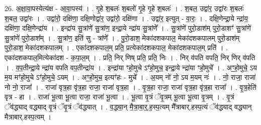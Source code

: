 \documentclass[17pt]{extarticle}
\begin{document}
26. अ॒क्षा॒वा॒पस्येत्य॑क्ष - आ॒वा॒पस्य॑ । . गृ॒हे श॒बलः॑ श॒बलो॑ गृ॒हे गृ॒हे श॒बलः॑ । . श॒बल॒ उद्वा॑र॒ उद्वा॑रः श॒बलः॑ श॒बल॒ उद्वा॑रः । . उद्वा॑रो॒ दक्षि॑णा॒ दक्षि॒णोद्वा॑र॒ उद्वा॑रो॒ दक्षि॑णा । . उद्वा॑र॒ इत्युत् - वा॒रः॒ । . दक्षि॒णेन्द्रा॒ये न्द्रा॑य॒ दक्षि॑णा॒ दक्षि॒णेन्द्रा॑य । . इन्द्रा॑य सु॒त्रांणे॑ सु॒त्रांण॒ इन्द्रा॒ये न्द्रा॑य सु॒त्रांणे᳚ । . सु॒त्रांणे॑ पुरो॒डाश॑म् पुरो॒डाशꣳ॑ सु॒त्रांणे॑ सु॒त्रांणे॑ पुरो॒डाश᳚म् । . सु॒त्रांण॒ इति॑ सु - त्रांणे᳚ । . पु॒रो॒डाश॒ मेका॑दशकपाल॒ मेका॑दशकपालम् पुरो॒डाश॑म् पुरो॒डाश॒ मेका॑दशकपालम् । . एका॑दशकपाल॒म् प्रति॒ प्रत्येका॑दशकपाल॒ मेका॑दशकपाल॒म् प्रति॑ । . एका॑दशकपाल॒मित्येका॑दश - क॒पा॒ल॒म् । . प्रति॒ निर् णिष् प्रति॒ प्रति॒ निः । . निर् व॑पति वपति॒ निर् णिर् व॑पति । . व॒प॒तीन्द्रा॒ये न्द्रा॑य वपति वप॒तीन्द्रा॑य । . इन्द्रा॑या ꣳहो॒मुचे ऽꣳ॑हो॒मुच॒ इन्द्रा॒ये न्द्रा॑या ꣳहो॒मुचे᳚ । . अꣳ॒॒हो॒मुचे॒ ऽय म॒य मꣳ॑हो॒मुचे ऽꣳ॑हो॒मुचे॒ ऽयम् । . अꣳ॒॒हो॒मुच॒ इत्यꣳ॑हः - मुचे᳚ । . अ॒यम् नो॑ नो॒ ऽय म॒यम् नः॑ । . नो॒ राजा॒ राजा॑ नो नो॒ राजा᳚ । . राजा॑ वृत्र॒हा वृ॑त्र॒हा राजा॒ राजा॑ वृत्र॒हा । . वृ॒त्र॒हा राजा॒ राजा॑ वृत्र॒हा वृ॑त्र॒हा राजा᳚ । . वृ॒त्र॒हेति॑ वृत्र - हा । . राजा॑ भू॒त्वा भू॒त्वा राजा॒ राजा॑ भू॒त्वा । . भू॒त्वा वृ॒त्रं ॅवृ॒त्रम् भू॒त्वा भू॒त्वा वृ॒त्रम् । . वृ॒त्रं ॅव॑द्ध्याद् वद्ध्याद् वृ॒त्रं ॅवृ॒त्रं ॅव॑द्ध्यात् । . व॒द्ध्या॒न् मै॒त्रा॒बा॒र्॒.ह॒स्प॒त्यम् मै᳚त्राबार्.हस्प॒त्यं ॅव॑द्ध्याद् वद्ध्यान् मैत्राबार्.हस्प॒त्यम् । \newline
\end{document}
